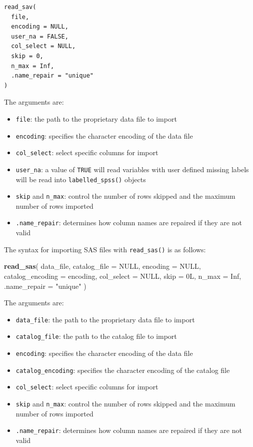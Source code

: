 \documentclass[
]{krantz}
\makeatletter
\newenvironment{Shaded}{\begin{snugshade}}{\end{snugshade}}
\newcommand{\AttributeTok}[1]{\textcolor[rgb]{0.27,0.27,0.27}{#1}}
\newcommand{\ConstantTok}[1]{\textcolor[rgb]{0.37,0.37,0.37}{#1}}
\newcommand{\FunctionTok}[1]{\textcolor[rgb]{0.27,0.27,0.27}{\textbf{#1}}}
\newcommand{\NormalTok}[1]{#1}
\newcommand{\StringTok}[1]{\textcolor[rgb]{0.5,0.5,0.5}{#1}}
\providecommand{\tightlist}{%
  \setlength{\itemsep}{0pt}\setlength{\parskip}{0pt}}
\newenvironment{kframe}{%
\medskip{}
\setlength{\fboxsep}{.8em}
 \def\at@end@of@kframe{}%
 \ifinner\ifhmode%
  \def\at@end@of@kframe{\end{minipage}}%
  \begin{minipage}{\columnwidth}%
 \fi\fi%
 \def\FrameCommand##1{\hskip\@totalleftmargin \hskip-\fboxsep
 \colorbox{shadecolor}{##1}\hskip-\fboxsep
     \hskip-\linewidth \hskip-\@totalleftmargin \hskip\columnwidth}%
 \MakeFramed {\advance\hsize-\width
   \@totalleftmargin\z@ \linewidth\hsize
   \@setminipage}}%
 {\par\unskip\endMakeFramed%
 \at@end@of@kframe}
\renewenvironment{Shaded}{\begin{kframe}}{\end{kframe}}
\makeatother
\begin{document}
\begin{verbatim}
read_sav(
  file,
  encoding = NULL,
  user_na = FALSE,
  col_select = NULL,
  skip = 0,
  n_max = Inf,
  .name_repair = "unique"
)
\end{verbatim}

The arguments are:

\begin{itemize}
\tightlist
\item
  \texttt{file}: the path to the proprietary data file to import
\item
  \texttt{encoding}: specifies the character encoding of the data file
\item
  \texttt{col\_select}: select specific columns for import
\item
  \texttt{user\_na}: a value of \texttt{TRUE} will read variables with user defined missing labels will be read into \texttt{labelled\_spss()} objects
\item
  \texttt{skip} and \texttt{n\_max}: control the number of rows skipped and the maximum number of rows imported
\item
  \texttt{.name\_repair}: determines how column names are repaired if they are not valid
\end{itemize}

The syntax for importing SAS files with \texttt{read\_sas()} is as follows:

\begin{Shaded}
\begin{Highlighting}[]
\FunctionTok{read\_sas}\NormalTok{(}
\NormalTok{  data\_file,}
  \AttributeTok{catalog\_file =} \ConstantTok{NULL}\NormalTok{,}
  \AttributeTok{encoding =} \ConstantTok{NULL}\NormalTok{,}
  \AttributeTok{catalog\_encoding =}\NormalTok{ encoding,}
  \AttributeTok{col\_select =} \ConstantTok{NULL}\NormalTok{,}
  \AttributeTok{skip =}\NormalTok{ 0L,}
  \AttributeTok{n\_max =} \ConstantTok{Inf}\NormalTok{,}
  \AttributeTok{.name\_repair =} \StringTok{"unique"}
\NormalTok{)}
\end{Highlighting}
\end{Shaded}

The arguments are:

\begin{itemize}
\tightlist
\item
  \texttt{data\_file}: the path to the proprietary data file to import
\item
  \texttt{catalog\_file}: the path to the catalog file to import
\item
  \texttt{encoding}: specifies the character encoding of the data file
\item
  \texttt{catalog\_encoding}: specifies the character encoding of the catalog file
\item
  \texttt{col\_select}: select specific columns for import
\item
  \texttt{skip} and \texttt{n\_max}: control the number of rows skipped and the maximum number of rows imported
\item
  \texttt{.name\_repair}: determines how column names are repaired if they are not valid
\end{itemize}
\end{document}
